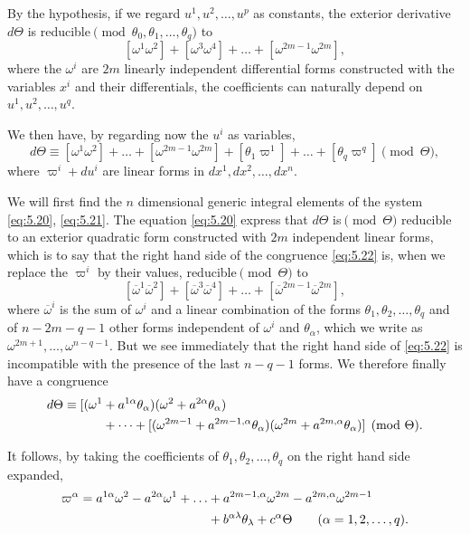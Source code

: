 By the hypothesis, if we regard $u^{1},u^{2},\dots,u^{p}$ as constants, the exterior derivative $d\Theta$ is reducible$\pmod{\theta_{0},\theta_{1},\dots,\theta_{q}}$ to
\[
[\omega^{1}\omega^{2}]+[\omega^{3}\omega^{4}]+\dots+[\omega^{2m-1}\omega^{2m}],
\]
where the $\omega^{i}$ are $2m$ linearly independent differential forms constructed with the variables $x^{i}$ and their differentials, the coefficients can naturally depend on $u^{1},u^{2},\dots,u^{q}$.

We then have, by regarding now the $u^{i}$ as variables,
\begin{equation}
  \label{eq:5.22}
  d\Theta\equiv[\omega^{1}\omega^{2}]+\dots+[\omega^{2m-1}\omega^{2m}]+[\theta_{1}\varpi^{1}]+\dots+[\theta_{q}\varpi^{q}]\pmod{\Theta},
\end{equation}
where $\varpi^{i}+du^{i}$ are linear forms in $dx^{1},dx^{2},\dots,dx^{n}$.



\vspace{12pt}\fsec We will first find the $n$ dimensional generic integral elements of the system \eqref{eq:5.20}, \eqref{eq:5.21}. The equation \eqref{eq:5.20} express that $d\Theta$ is$\pmod{\Theta}$ reducible to an exterior quadratic form constructed with $2m$ independent linear forms, which is to say that the right hand side of the congruence \eqref{eq:5.22} is, when we replace the $\varpi^{i}$ by their values, reducible$\pmod{\Theta}$ to
\[
[\overline\omega^{1}\overline\omega^{2}]+[\overline\omega^{3}\overline\omega^{4}]+\dots+[\overline\omega^{2m-1}\overline\omega^{2m}],
\]  
where $\overline\omega^{i}$ is the sum of $\omega^{i}$ and a linear combination of the forms $\theta_{1},\theta_{2},\dots, \theta_{q}$ and of $n-2m-q-1$ other forms independent of $\omega^{i}$ and $\theta_{\alpha}$, which we write as $\omega^{2m+1},\dots,\omega^{n-q-1}$. But we see immediately that the right hand side of \eqref{eq:5.22} is incompatible with the presence of the last $n-q-1$ forms. We therefore finally have a congruence
\begin{align}
  \label{eq:5.23}
  d\Theta\equiv[(\omega^{1}&+a^{1\alpha}\theta_{\alpha})(\omega^{2}+a^{2\alpha}\theta_{\alpha})\\
  &+\dots+[(\omega^{2m-1}+a^{2m-1,\alpha}\theta_{\alpha})(\omega^{2m}+a^{2m,\alpha}\theta_{\alpha})]\pmod{\Theta}.\notag
\end{align}

It follows, by taking the coefficients of $\theta_{1},\theta_{2},\dots,\theta_{q}$ on the right hand side expanded,
\begin{align}
  \label{eq:5.24}
  \varpi^{\alpha}=a^{1\alpha}\omega^{2}-a^{2\alpha}\omega^{1}+\dots&+a^{2m-1,\alpha}\omega^{2m}-a^{2m,\alpha}\omega^{2m-1}\\
  &+b^{\alpha\lambda}\theta_{\lambda}+c^{\alpha}\Theta\qquad(\alpha=1,2,\dots,q).\notag
\end{align}

